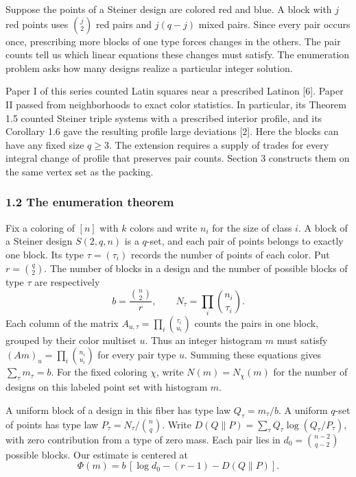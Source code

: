 \documentclass[english,11pt,a4paper]{article}
\begin{document}
Suppose the points of a Steiner design are colored red and blue. A block with \(j\) red points uses \(\binom j2\) red pairs and \(j(q-j)\) mixed pairs. Since every pair occurs once, prescribing more blocks of one type forces changes in the others. The pair counts tell us which linear equations these changes must satisfy. The enumeration problem asks how many designs realize a particular integer solution.

Paper I of this series counted Latin squares near a prescribed Latinon {[}6{]}. Paper II passed from neighborhoods to exact color statistics. In particular, its Theorem 1.5 counted Steiner triple systems with a prescribed interior profile, and its Corollary 1.6 gave the resulting profile large deviations {[}2{]}. Here the blocks can have any fixed size \(q\ge3\). The extension requires a supply of trades for every integral change of profile that preserves pair counts. Section 3 constructs them on the same vertex set as the packing.

\subsubsection{1.2 The enumeration theorem}\label{the-enumeration-theorem}

Fix a coloring of \([n]\) with \(k\) colors and write \(n_i\) for the size of class \(i\). A block of a Steiner design \(S(2,q,n)\) is a \(q\)-set, and each pair of points belongs to exactly one block. Its type \(\tau=(\tau_i)\) records the number of points of each color. Put \(r=\binom q2\). The number of blocks in a design and the number of possible blocks of type \(\tau\) are respectively \[b=\frac{\binom n2}{r},\qquad N_\tau=\prod_i\binom{n_i}{\tau_i}.\] Each column of the matrix \(A_{u,\tau}=\prod_i\binom{\tau_i}{u_i}\) counts the pairs in one block, grouped by their color multiset \(u\). Thus an integer histogram \(m\) must satisfy \((Am)_u=\prod_i\binom{n_i}{u_i}\) for every pair type \(u\). Summing these equations gives \(\sum_\tau m_\tau=b\). For the fixed coloring \(\chi\), write \(N(m)=N_\chi(m)\) for the number of designs on this labeled point set with histogram \(m\).

A uniform block of a design in this fiber has type law \(Q_\tau=m_\tau/b\). A uniform \(q\)-set of points has type law \(P_\tau=N_\tau/\binom nq\). Write \(D(Q\|P)=\sum_\tau Q_\tau\log(Q_\tau/P_\tau)\), with zero contribution from a type of zero mass. Each pair lies in \(d_0=\binom{n-2}{q-2}\) possible blocks. Our estimate is centered at \[\Phi(m)=b\,[\log d_0-(r-1)-D(Q\|P)]. \tag{1}\]
\end{document}

